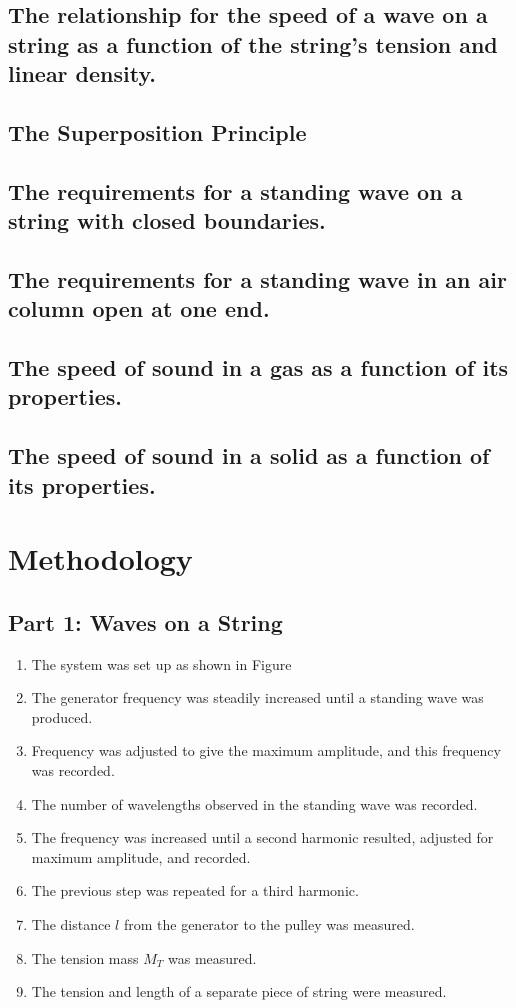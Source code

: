 \documentclass[twocolumn,english]{IEEEtran}
\theoremstyle{plain}
\theoremstyle{plain}
\begin{document}
\subsection*{The relationship for the speed of a wave on a string as a function of the string's tension and linear density.}

\subsection*{The Superposition Principle}

\subsection*{The requirements for a standing wave on a string with closed boundaries.}

\subsection*{The requirements for a standing wave in an air column open at one end.}

\subsection*{The speed of sound in a gas as a function of its properties.}

\subsection*{The speed of sound in a solid as a function of its properties.}

\section{Methodology}
\subsection*{Part 1: Waves on a String}
\begin{enumerate}
 \item The system was set up as shown in Figure %
 \item The generator frequency was steadily increased until a standing wave was produced.
 \item Frequency was adjusted to give the maximum amplitude, and this frequency was recorded.
 \item The number of wavelengths observed in the standing wave was recorded.
 \item The frequency was increased until a second harmonic resulted, adjusted for maximum amplitude, and recorded.
 \item The previous step was repeated for a third harmonic.
 \item The distance $l$ from the generator to the pulley was measured.
 \item The tension mass $M_T$ was measured.
 \item The tension and length of a separate piece of string were measured.
\end{enumerate}
\end{document}
